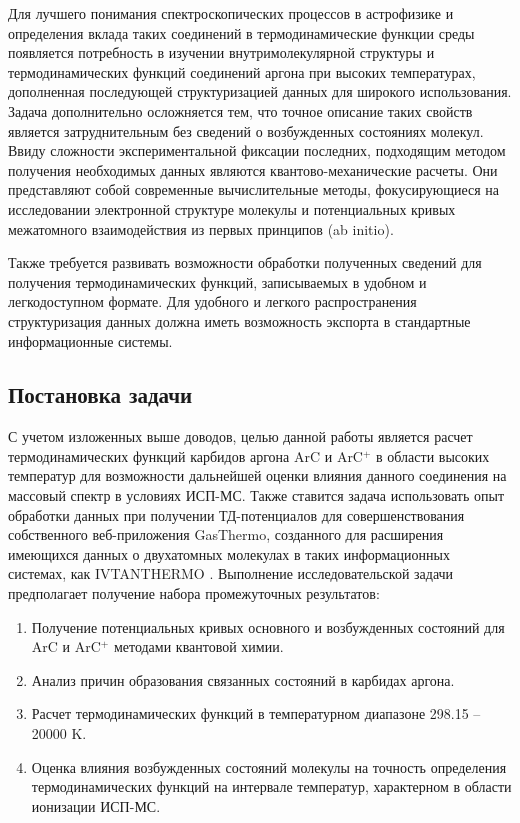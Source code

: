 \documentclass[12pt]{extarticle}
\begin{document}
    Для лучшего понимания спектроскопических процессов в астрофизике и определения вклада таких соединений в термодинамические функции среды появляется потребность в изучении внутримолекулярной структуры и термодинамических функций соединений аргона при высоких температурах, дополненная последующей структуризацией данных для широкого использования. Задача дополнительно осложняется тем, что точное описание таких свойств является затруднительным без сведений о возбужденных состояниях молекул. Ввиду сложности экспериментальной фиксации последних, подходящим методом получения необходимых данных являются квантово-механические расчеты. Они представляют собой современные вычислительные методы, фокусирующиеся на исследовании электронной структуре молекулы и потенциальных кривых межатомного взаимодействия из первых принципов (ab initio).
    
    Также требуется развивать возможности обработки полученных сведений для получения термодинамических функций, записываемых в удобном и легкодоступном формате. Для удобного и легкого распространения структуризация данных должна иметь возможность экспорта в стандартные информационные системы.
        
    \subsection{Постановка задачи}
    \label{sec:Chapter0.2}
    
    С учетом изложенных выше доводов, целью данной работы является расчет термодинамических функций карбидов аргона ArC и ArC$^+$ в области высоких температур для возможности дальнейшей оценки влияния данного соединения на массовый спектр в условиях ИСП-МС. Также ставится задача использовать опыт обработки данных при получении ТД-потенциалов для совершенствования собственного веб-приложения GasThermo, созданного для расширения имеющихся данных о двухатомных молекулах в таких информационных системах, как IVTANTHERMO \cite{Gurvich,Belov_ivtanthermo}. Выполнение исследовательской задачи предполагает получение набора промежуточных результатов:
    
    \begin{enumerate}
    	\item Получение потенциальных кривых основного и возбужденных состояний для ArC и ArC$^+$ методами квантовой химии.
    	
    	\item Анализ причин образования связанных состояний в карбидах аргона.
    	
    	\item Расчет термодинамических функций в температурном диапазоне 298.15 -- 20000 K.
    	
    	\item Оценка влияния возбужденных состояний молекулы на точность определения термодинамических функций на интервале температур, характерном в области ионизации ИСП-МС.
    \end{enumerate}
    
\end{document}
